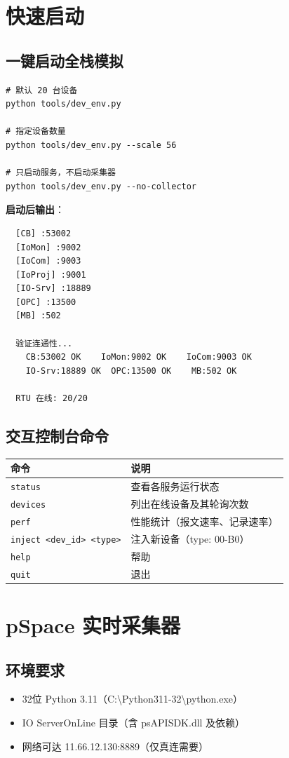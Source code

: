 \documentclass[12pt,a4paper]{ctexart}
\begin{document}
\section{快速启动}

\subsection{一键启动全栈模拟}
\begin{lstlisting}
# 默认 20 台设备
python tools/dev_env.py

# 指定设备数量
python tools/dev_env.py --scale 56

# 只启动服务，不启动采集器
python tools/dev_env.py --no-collector
\end{lstlisting}

\textbf{启动后输出}：
\begin{verbatim}
  [CB] :53002
  [IoMon] :9002
  [IoCom] :9003
  [IoProj] :9001
  [IO-Srv] :18889
  [OPC] :13500
  [MB] :502

  验证连通性...
    CB:53002 OK    IoMon:9002 OK    IoCom:9003 OK
    IO-Srv:18889 OK  OPC:13500 OK    MB:502 OK

  RTU 在线: 20/20
\end{verbatim}

\subsection{交互控制台命令}
\begin{table}[H]\centering
\begin{tabular}{lp{5cm}}
\toprule
\textbf{命令} & \textbf{说明} \\
\midrule
\texttt{status} & 查看各服务运行状态 \\
\texttt{devices} & 列出在线设备及其轮询次数 \\
\texttt{perf} & 性能统计（报文速率、记录速率） \\
\texttt{inject <dev\_id> <type>} & 注入新设备（type: 00-B0） \\
\texttt{help} & 帮助 \\
\texttt{quit} & 退出 \\
\bottomrule
\end{tabular}
\end{table}

\section{pSpace 实时采集器}

\subsection{环境要求}
\begin{itemize}[leftmargin=*]
  \item 32位 Python 3.11（C:\textbackslash Python311-32\textbackslash python.exe）
  \item IO ServerOnLine 目录（含 psAPISDK.dll 及依赖）
  \item 网络可达 11.66.12.130:8889（仅真连需要）
\end{itemize}
\end{document}
